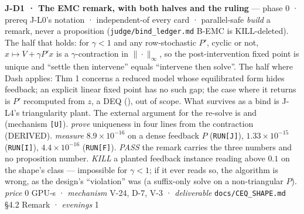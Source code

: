 \documentclass[11pt,a4paper]{article}
\theoremstyle{plain}
\theoremstyle{definition}
\theoremstyle{remark}
\begin{document}
\textbf{J-D1 · The EMC remark, with both halves and the ruling} ---
phase 0 · prereq J-L0's notation · independent-of every card ·
parallel-safe \emph{build} a remark, never a proposition
(\texttt{judge/bind\_ledger.md} B-EMC is KILL-deleted). The half that
holds: for \(\gamma<1\) and any row-stochastic \(P'\), cyclic or not,
\(x\mapsto V+\gamma P'x\) is a \(\gamma\)-contraction in
\(\|\cdot\|_\infty\), so the post-intervention fixed point is unique and
``settle then intervene'' equals ``intervene then solve''. The half
where Dash applies: \citep{dash-2005-emc} Thm 1 concerns a reduced model
whose equilibrated form hides feedback; an explicit linear fixed point
has no such gap; the case where it returns is \(P'\) recomputed from
\(z\), a DEQ (\citep{bai-2019-deq}), out of scope. What survives as a
bind is J-L4's triangularity plant. The external argument for the
re-solve is \citep{momennejad-2017-sr} and
\citep{russek-2017-predictive} (mechanism \texttt{{[}U{]}}).
\emph{prove} uniqueness in four lines from the contraction (DERIVED).
\emph{measure} \(8.9\times10^{-16}\) on a dense feedback \(P\)
(\texttt{RUN{[}J{]}}), \(1.33\times10^{-15}\) (\texttt{RUN{[}I{]}}),
\(4.4\times10^{-16}\) (\texttt{RUN{[}F{]}}). \emph{PASS} the remark
carries the three numbers and no proposition number. \emph{KILL} a
planted feedback instance reading above \(0.1\) on the shape's class ---
impossible for \(\gamma<1\); if it ever reads so, the algorithm is
wrong, as the design's ``violation'' was (a suffix-only solve on a
non-triangular \(P\)). \emph{price} \(0\) GPU-s · \emph{mechanism} V-24,
D-7, V-3 · \emph{deliverable} \texttt{docs/CEQ\_SHAPE.md} §4.2 Remark ·
\emph{evenings} 1
\end{document}
